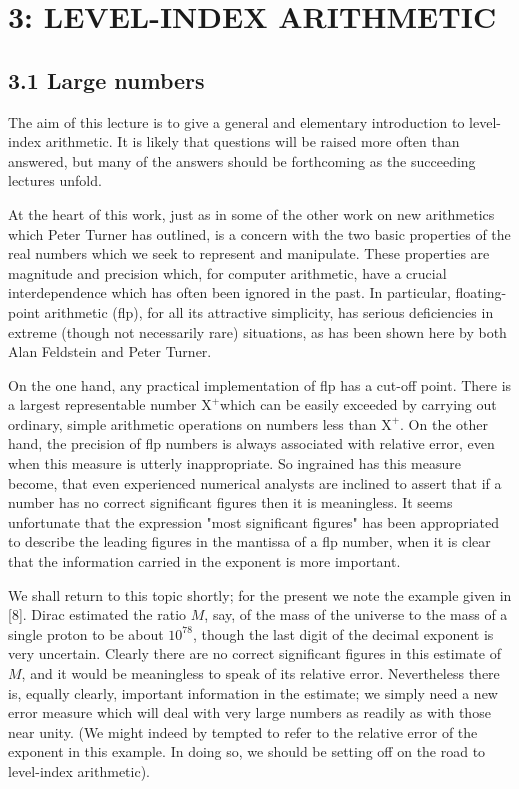 \documentclass[10pt]{article}
\begin{document}
\section*{3: LEVEL-INDEX ARITHMETIC }


\subsection*{3.1 Large numbers}
The aim of this lecture is to give a general and elementary introduction to level-index arithmetic. It is likely that questions will be raised more often than answered, but many of the answers should be forthcoming as the succeeding lectures unfold.

At the heart of this work, just as in some of the other work on new arithmetics which Peter Turner has outlined, is a concern with the two basic properties of the real numbers which we seek to represent and manipulate. These properties are magnitude and precision which, for computer arithmetic, have a crucial interdependence which has often been ignored in the past. In particular, floating-point arithmetic (flp), for all its attractive simplicity, has serious deficiencies in extreme (though not necessarily rare) situations, as has been shown here by both Alan Feldstein and Peter Turner.

On the one hand, any practical implementation of flp has a cut-off point. There is a largest representable number $\mathrm{X}^{+}$which can be easily exceeded by carrying out ordinary, simple arithmetic operations on numbers less than $\mathrm{X}^{+}$. On the other hand, the precision of flp numbers is always associated with relative error, even when this measure is utterly inappropriate. So ingrained has this measure become, that even experienced numerical analysts are inclined to assert that if a number has no correct significant figures then it is meaningless. It seems unfortunate that the expression "most significant figures" has been appropriated to describe the leading figures in the mantissa of a flp number, when it is clear that the information carried in the exponent is more important.

We shall return to this topic shortly; for the present we note the example given in [8]. Dirac estimated the ratio $M$, say, of the mass of the universe to the mass of a single proton to be about $10^{78}$, though the last digit of the decimal exponent is very uncertain. Clearly there are no correct significant figures in this estimate of $M$, and it would be meaningless to speak of its relative error. Nevertheless there is, equally clearly, important information in the estimate; we simply need a new error measure which will deal with very large numbers as readily as with those near unity. (We might indeed by tempted to refer to the relative error of the exponent in this example. In doing so, we should be setting off on the road to level-index arithmetic).
\end{document}
